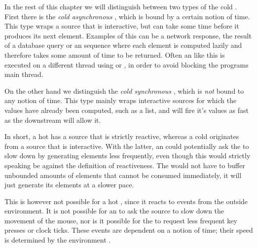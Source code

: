 In the rest of this chapter we will distinguish between two types of the cold \obs. First there is the \textit{cold asynchronous \obs}, which is bound by a certain notion of time. This type wraps a source that is interactive, but can take some time before it produces its next element. Examples of this can be a network response, the result of a database query or an \ieb sequence where each element is computed lazily and therefore takes some amount of time to be returned. Often an \obs like this is executed on a different thread using  or , in order to avoid blocking the programs main thread.

On the other hand we distinguish the \textit{cold synchronous \obs}, which is \emph{not} bound to any notion of time. This type mainly wraps interactive sources for which the values have already been computed, such as a list, and will fire it's values as fast as the downstream will allow it.

In short, a hot \obs has a source that is strictly reactive, whereas a cold \obs originates from a source that is interactive. With the latter, an \obv could potentially ask the \obs to slow down by generating elements less frequently, even though this would strictly speaking be against the definition of reactiveness. The \obs would not have to buffer unbounded amounts of elements that cannot be consumed immediately, it will just generate its elements at a slower pace.

This is however not possible for a hot \obs, since it reacts to events from the outside environment. It is not possible for an \obv to ask the source to slow down the movement of the mouse, nor is it possible for the \obv to request less frequent key presses or clock ticks. These events are dependent on a notion of time; their speed is determined by the environment \cite{berry1991-Reactive}.
